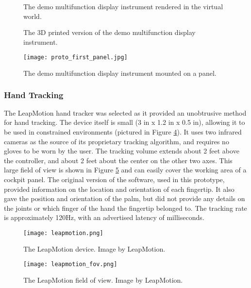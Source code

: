 \begin{figure}
    \centering
    \caption{The demo multifunction display instrument rendered in the virtual world.}
    \label{fig:proto_mfd_render}
\end{figure}

\begin{figure}
    \centering
    \caption{The 3D printed version of the demo multifunction display instrument.}
    \label{fig:proto_mfd_print}
\end{figure}

\begin{figure}
    \centering
    \texttt{[image: proto\_first\_panel.jpg]}
    \caption{The demo multifunction display instrument mounted on a panel.}
    \label{fig:proto_first_panel}
\end{figure}


\subsubsection{Hand Tracking}

The LeapMotion hand tracker was selected as it provided an unobtrusive method for hand tracking.
The device itself is small (3 in x 1.2 in x 0.5 in), allowing it to be used in constrained environments (pictured in Figure \ref{fig:proto_leap_device}).
It uses two infrared cameras as the source of its proprietary tracking algorithm, and requires no gloves to be worn by the user.
The tracking volume extends about 2 feet above the controller, and about 2 feet about the center on the other two axes.
This large field of view is shown in Figure \ref{fig:proto_leap_fov} and can easily cover the working area of a cockpit panel.
The original version of the software, used in this prototype, provided information on the location and orientation of each fingertip.
It also gave the position and orientation of the palm, but did not provide any details on the joints or which finger of the hand the fingertip belonged to.
The tracking rate is approximately 120Hz, with an advertised latency of milliseconds.

\begin{figure}
    \centering
    \texttt{[image: leapmotion.png]}
    \caption{The LeapMotion device. Image by LeapMotion.}
    \label{fig:proto_leap_device}
\end{figure}

\begin{figure}
    \centering
    \texttt{[image: leapmotion\_fov.png]}
    \caption{The LeapMotion field of view. Image by LeapMotion.}
    \label{fig:proto_leap_fov}
\end{figure}

